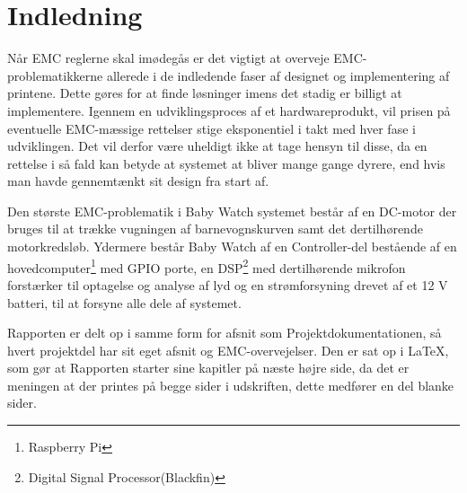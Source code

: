 \chapter{Indledning}

Når EMC reglerne skal imødegås er det vigtigt at overveje EMC-problematikkerne allerede i de indledende faser af designet og implementering af printene. Dette gøres for at finde løsninger imens det stadig er billigt at implementere. Igennem en udviklingsproces af et hardwareprodukt, vil prisen på eventuelle EMC-mæssige rettelser stige eksponentiel i takt med hver fase i udviklingen. Det vil derfor være uheldigt ikke at tage hensyn til disse, da en rettelse i så fald kan betyde at systemet at bliver mange gange dyrere, end hvis man havde gennemtænkt sit design fra start af.

Den største EMC-problematik i Baby Watch systemet består af en DC-motor der bruges til at trække vugningen af barnevognskurven samt det dertilhørende motorkredsløb. Ydermere består Baby Watch af en Controller-del bestående af en hovedcomputer\footnote{Raspberry Pi} med GPIO porte, en DSP\footnote{Digital Signal Processor(Blackfin)} med dertilhørende mikrofon forstærker til optagelse og analyse af lyd og en strømforsyning drevet af et 12 V batteri, til at forsyne alle dele af systemet.

Rapporten er delt op i samme form for afsnit som Projektdokumentationen, så hvert projektdel har sit eget afsnit og EMC-overvejelser. Den er sat op i LaTeX, som gør at Rapporten starter sine kapitler på næste højre side, da det er meningen at der printes på begge sider i udskriften, dette medfører en del blanke sider.

